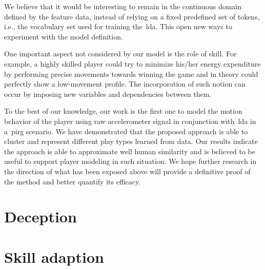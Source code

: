 We believe that it would be interesting to remain in the continuous domain defined by the feature data, instead of relying on a fixed predefined set of tokens, i.e., the vocabulary set used for training the~\gls{lda}. This open new ways to experiment with the model definition.

One important aspect not considered by our model is the role of skill. For example, a highly skilled player could try to minimize his/her energy expenditure by performing precise movements towards winning the game and in theory could perfectly show a low-movement profile.  The incorporation of such notion can occur by imposing new variables and dependencies between them. 

To the best of our knowledge, our work is the first one to model the motion behavior of the player using raw accelerometer signal in conjunction with~\gls{lda} in a~\gls{pirg} scenario. We have demonstrated that the proposed approach is able to cluster and represent different play types learned from data. Our results indicate the approach is able to approximate well human similarity and is believed to be useful to support player modeling in such situation. We hope further research in the direction of what has been exposed above will provide a definitive proof of the method and better quantify its efficacy. 

\section{Deception}


\section{Skill adaption}

